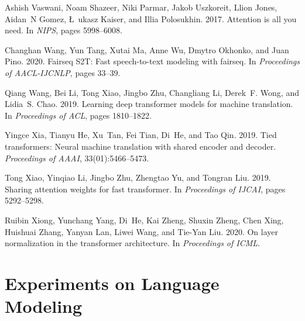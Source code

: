 \documentclass[11pt]{article}
\begin{document}
\begin{thebibliography}{37}
Ashish Vaswani, Noam Shazeer, Niki Parmar, Jakob Uszkoreit, Llion Jones,
  Aidan~N Gomez, \L~ukasz Kaiser, and Illia Polosukhin. 2017.
\newblock Attention is all you need.
\newblock In \emph{NIPS}, pages 5998--6008.

Changhan Wang, Yun Tang, Xutai Ma, Anne Wu, Dmytro Okhonko, and Juan Pino.
  2020.
\newblock Fairseq {S}2{T}: Fast speech-to-text modeling with fairseq.
\newblock In \emph{Proceedings of AACL-IJCNLP}, pages 33--39.

Qiang Wang, Bei Li, Tong Xiao, Jingbo Zhu, Changliang Li, Derek~F. Wong, and
  Lidia~S. Chao. 2019.
\newblock Learning deep transformer models for machine translation.
\newblock In \emph{Proceedings of ACL}, pages 1810--1822.

Yingce Xia, Tianyu He, Xu~Tan, Fei Tian, Di~He, and Tao Qin. 2019.
\newblock Tied transformers: Neural machine translation with shared encoder and
  decoder.
\newblock \emph{Proceedings of AAAI}, 33(01):5466--5473.

Tong Xiao, Yinqiao Li, Jingbo Zhu, Zhengtao Yu, and Tongran Liu. 2019.
\newblock Sharing attention weights for fast transformer.
\newblock In \emph{Proceedings of IJCAI}, pages 5292--5298.

Ruibin Xiong, Yunchang Yang, Di~He, Kai Zheng, Shuxin Zheng, Chen Xing,
  Huishuai Zhang, Yanyan Lan, Liwei Wang, and Tie-Yan Liu. 2020.
\newblock On layer normalization in the transformer architecture.
\newblock In \emph{Proceedings of ICML}.

\end{thebibliography}
 
\clearpage

\appendix

\section{Experiments on Language Modeling}
\label{sec:exp_lm}
\end{document}
